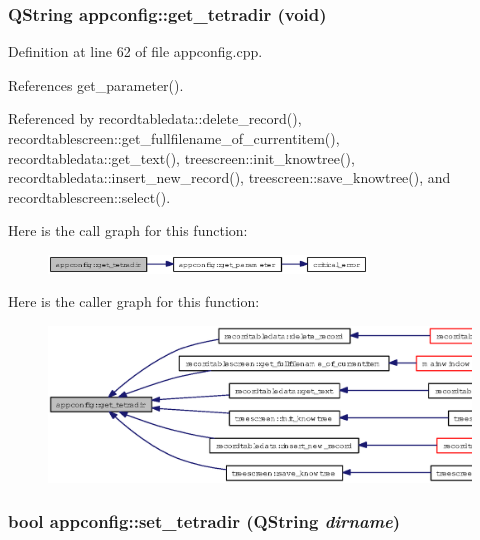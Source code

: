 \subsubsection{\setlength{\rightskip}{0pt plus 5cm}QString appconfig::get\_\-tetradir (void)}\label{classappconfig_3d61e98d919332ceb6acb2e03d8f848b}




Definition at line 62 of file appconfig.cpp.

References get\_\-parameter().

Referenced by recordtabledata::delete\_\-record(), recordtablescreen::get\_\-fullfilename\_\-of\_\-currentitem(), recordtabledata::get\_\-text(), treescreen::init\_\-knowtree(), recordtabledata::insert\_\-new\_\-record(), treescreen::save\_\-knowtree(), and recordtablescreen::select().

Here is the call graph for this function:\begin{figure}[H]
\begin{center}
\leavevmode
\includegraphics[width=240pt]{classappconfig_3d61e98d919332ceb6acb2e03d8f848b_cgraph}
\end{center}
\end{figure}


Here is the caller graph for this function:\begin{figure}[H]
\begin{center}
\leavevmode
\includegraphics[width=370pt]{classappconfig_3d61e98d919332ceb6acb2e03d8f848b_icgraph}
\end{center}
\end{figure}
\subsubsection{\setlength{\rightskip}{0pt plus 5cm}bool appconfig::set\_\-tetradir (QString {\em dirname})}\label{classappconfig_f90278aac0141bdc3d1f2869e0b85733}




